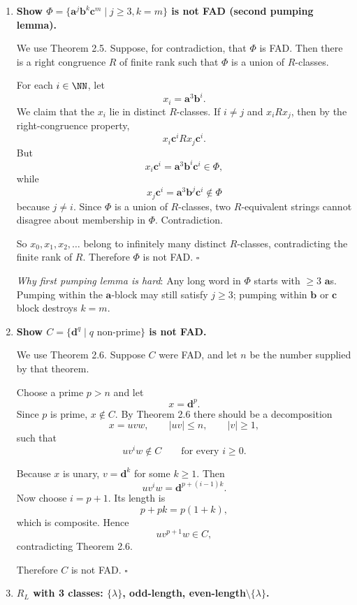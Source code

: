 \begin{enumerate}[{2.}1.]
\item \textbf{Show $\Phi=\{\mathbf{a}^j\mathbf{b}^k\mathbf{c}^m\mid j\geq 3,k=m\}$ is not FAD (second pumping lemma).}

We use Theorem 2.5. Suppose, for contradiction, that $\Phi$ is FAD. Then there is a
right congruence $R$ of finite rank such that $\Phi$ is a union of $R$-classes.

For each $i\in\NN$, let
\[
x_i=\mathbf{a}^3\mathbf{b}^i.
\]
We claim that the $x_i$ lie in distinct $R$-classes. If $i\neq j$ and $x_i R x_j$, then
by the right-congruence property,
\[
x_i\mathbf{c}^i R x_j\mathbf{c}^i.
\]
But
\[
x_i\mathbf{c}^i=\mathbf{a}^3\mathbf{b}^i\mathbf{c}^i\in\Phi,
\]
while
\[
x_j\mathbf{c}^i=\mathbf{a}^3\mathbf{b}^j\mathbf{c}^i\notin\Phi
\]
because $j\neq i$.
Since $\Phi$ is a union of $R$-classes, two $R$-equivalent strings cannot disagree
about membership in $\Phi$. Contradiction.

So $x_0,x_1,x_2,\ldots$ belong to infinitely many distinct $R$-classes, contradicting
the finite rank of $R$. Therefore $\Phi$ is not FAD. $\square$

\textit{Why first pumping lemma is hard}: Any long word in $\Phi$ starts with $\geq 3$ $\mathbf{a}$s. Pumping within the $\mathbf{a}$-block may still satisfy $j\geq 3$; pumping within $\mathbf{b}$ or $\mathbf{c}$ block destroys $k=m$.

\item \textbf{Show $C=\{\mathbf{d}^q\mid q\text{ non-prime}\}$ is not FAD.}

We use Theorem 2.6. Suppose $C$ were FAD, and let $n$ be the number supplied by
that theorem.

Choose a prime $p>n$ and let
\[
x=\mathbf{d}^p.
\]
Since $p$ is prime, $x\notin C$. By Theorem 2.6 there should be a decomposition
\[
x=uvw,\qquad |uv|\le n,\qquad |v|\ge1,
\]
such that
\[
uv^iw\notin C\qquad\text{for every }i\ge0.
\]

Because $x$ is unary, $v=\mathbf{d}^k$ for some $k\ge1$. Then
\[
uv^iw=\mathbf{d}^{ p+(i-1)k}.
\]
Now choose $i=p+1$. Its length is
\[
p+pk=p(1+k),
\]
which is composite. Hence
\[
uv^{p+1}w\in C,
\]
contradicting Theorem 2.6.

Therefore $C$ is not FAD. $\square$

\item \textbf{$R_L$ with 3 classes: $\{\lambda\}$, odd-length, even-length$\setminus\{\lambda\}$.}


\end{enumerate}

